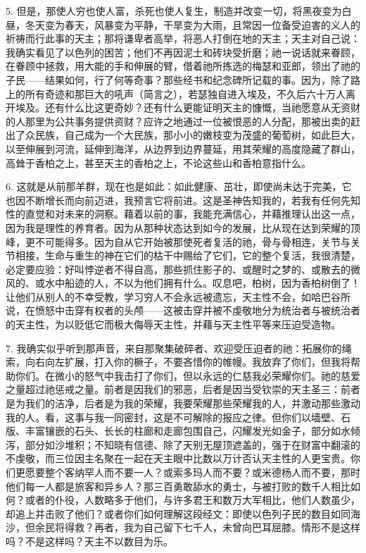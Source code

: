 5. 但是，那使人穷也使人富，杀死也使人复生，制造并改变一切，将黑夜变为白昼，冬天变为春天，风暴变为平静，干旱变为大雨，且常因一位备受迫害的义人的祈祷而行此事的天主；那将谦卑者高举，将恶人打倒在地的天主；天主对自己说：我确实看见了以色列的困苦；他们不再因泥土和砖块受折磨；祂一说话就来眷顾，在眷顾中拯救，用大能的手和伸展的臂，借着祂所拣选的梅瑟和亚郎，领出了祂的子民——结果如何，行了何等奇事？那些经书和纪念碑所记载的事。因为，除了路上的所有奇迹和那巨大的吼声（简言之），若瑟独自进入埃及，不久后六十万人离开埃及。还有什么比这更奇妙？还有什么更能证明天主的慷慨，当祂愿意从无资财的人那里为公共事务提供资财？应许之地通过一位被恨恶的人分配，那被出卖的赶出了众民族，自己成为一个大民族，那小小的嫩枝变为茂盛的葡萄树，如此巨大，以至伸展到河流，延伸到海洋，从边界到边界蔓延，用其荣耀的高度隐藏了群山，高耸于香柏之上，甚至天主的香柏之上，不论这些山和香柏意指什么。\par

6. 这就是从前那羊群，现在也是如此：如此健康、茁壮，即使尚未达于完美，它也因不断增长而向前迈进，我预言它将前进。这是圣神告知我的，若我有任何先知性的直觉和对未来的洞察。藉着以前的事，我能充满信心，并藉推理认出这一点，因为我是理性的养育者。因为从那种状态达到如今的发展，比从现在达到荣耀的顶峰，更不可能得多。因为自从它开始被那使死者复活的祂，骨与骨相连，关节与关节相接，生命与重生的神在它们的枯干中赐给了它们，它的整个复活，我很清楚，必定要应验：好叫悖逆者不得自高，那些抓住影子的、或醒时之梦的、或散去的微风的、或水中船迹的人，不以为他们拥有什么。叹息吧，柏树，因为香柏树倒了！让他们从别人的不幸受教，学习穷人不会永远被遗忘，天主性不会，如哈巴谷所说，在愤怒中击穿有权者的头颅——这被击穿并被不虔敬地分为统治者与被统治者的天主性，为以贬低它而极大侮辱天主性，并藉与天主性平等来压迫受造物。\par

7. 我确实似乎听到那声音，来自那聚集破碎者、欢迎受压迫者的祂：拓展你的绳索，向右向左扩展，打入你的橛子，不要吝惜你的帷幔。我放弃了你们，但我将帮助你们。在微小的怒气中我击打了你们，但以永远的仁慈我必荣耀你们。祂的慈爱之量超过祂惩戒之量。前者是因我们的邪恶，后者是因当受钦崇的天主圣三：前者是为我们的洁净，后者是为我的荣耀，我要荣耀那些荣耀我的人，并激动那些激动我的人。看，这事与我一同密封，这是不可解除的报应之律。但你们以墙壁、石版、丰富镶嵌的石头、长长的柱廊和走廊包围自己，闪耀发光如金子，部分如水倾泻，部分如沙堆积；不知晓有信德、除了天别无屋顶遮盖的，强于在财富中翻滚的不虔敬，而三位因主名聚在一起在天主眼中比数以万计否认天主性的人更宝贵。你们更愿要整个客纳罕人而不要一人？或索多玛人而不要？或米德杨人而不要，那时他们每一人都是旅客和异乡人？那三百勇敢舔水的勇士，与被打败的数千人相比如何？或者的仆役，人数略多于他们，与许多君王和数万大军相比，他们人数虽少，却追上并击败了他们？或者你们如何理解这段经文：即使以色列子民的数目如同海沙，但余民将得救？再者，我为自己留下七千人，未曾向巴耳屈膝。情形不是这样吗？不是这样吗？天主不以数目为乐。\par

